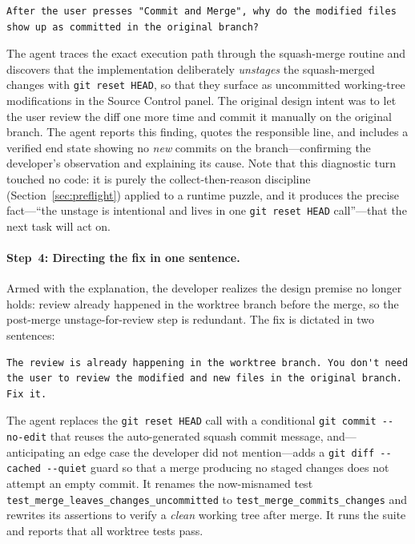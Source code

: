 \documentclass{article}
\begin{document}
\begin{lstlisting}[style=prompt]
After the user presses "Commit and Merge", why do the modified files
show up as committed in the original branch?
\end{lstlisting}

\noindent The agent traces the exact execution path through the
squash-merge routine and discovers that the implementation
deliberately \emph{unstages} the squash-merged changes with
\texttt{git reset HEAD}, so that they surface as uncommitted
working-tree modifications in the Source Control panel.
The original design intent was to let the user review the diff one more
time and commit it manually on the original branch.
The agent reports this finding, quotes the responsible line, and
includes a verified end state showing no \emph{new} commits on the
branch---confirming the developer's observation and explaining its
cause.
Note that this diagnostic turn touched no code: it is purely the
collect-then-reason discipline (Section~\ref{sec:preflight}) applied to
a runtime puzzle, and it produces the precise fact---``the unstage is
intentional and lives in one \texttt{git reset HEAD} call''---that the
next task will act on.

\paragraph{Step~4: Directing the fix in one sentence.}
Armed with the explanation, the developer realizes the design premise
no longer holds: review already happened in the worktree branch before
the merge, so the post-merge unstage-for-review step is redundant.
The fix is dictated in two sentences:

\begin{lstlisting}[style=prompt]
The review is already happening in the worktree branch. You don't need
the user to review the modified and new files in the original branch.
Fix it.
\end{lstlisting}

\noindent The agent replaces the \texttt{git reset HEAD} call with a
conditional \texttt{git commit -{}-no-edit} that reuses the
auto-generated squash commit message, and---anticipating an
edge case the developer did not mention---adds a
\texttt{git diff -{}-cached -{}-quiet} guard so that a merge producing no
staged changes does not attempt an empty commit.
It renames the now-misnamed test
\texttt{test\_merge\_leaves\_changes\_uncommitted} to
\texttt{test\_merge\_commits\_changes} and rewrites its assertions to
verify a \emph{clean} working tree after merge.
It runs the suite and reports that all worktree tests pass.
\end{document}
